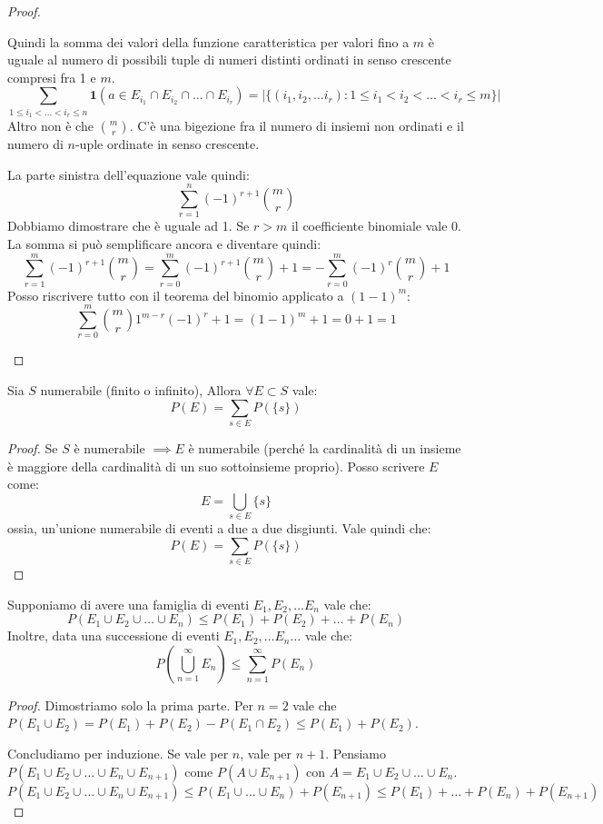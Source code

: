 \begin{proof}
\begin{enumerate}
    Quindi la somma dei valori della funzione caratteristica per valori fino a $m$ \`e uguale al numero di possibili tuple di numeri distinti ordinati in senso crescente compresi fra 1 e $m$.
    \[
    \sum_{1 \le i_1 < \dots < i_r \le n} \mathbf{1}(a \in E_{i_1} \cap E_{i_2} \cap \dots \cap E_{i_r}) = \left| \{(i_1,i_2, \dots i_r) : 1 \le i_1 < i_2 < \dots < i_r \le m\} \right|
    \]
    Altro non \`e che $\binom{m}{r}$. C'\`e una bigezione fra il numero di insiemi non ordinati e il numero di $n$-uple ordinate in senso crescente.

    La parte sinistra dell'equazione vale quindi:
    \[
    \sum_{r = 1}^{n} (-1)^{r+1} \binom{m}{r}
    \]
    Dobbiamo dimostrare che \`e uguale ad 1. Se $r > m$ il coefficiente binomiale vale 0. La somma si pu\`o semplificare ancora e diventare quindi:
    \[
    \sum_{r = 1}^{m} (-1)^{r+1} \binom{m}{r} =
    \sum_{r = 0}^{m} (-1)^{r+1} \binom{m}{r} + 1 =
    - \sum_{r = 0}^{m} (-1)^{r} \binom{m}{r} + 1
    \]
    Posso riscrivere tutto con il teorema del binomio applicato a $(1 - 1)^m$:
    \[
    \sum_{r = 0}^{m} \binom{m}{r} 1^{m-r} (-1)^r + 1 = (1-1)^m + 1 = 0 + 1 = 1
    \]
\end{enumerate}
\end{proof}
\begin{prop}\label{numerabile}
Sia $S$ numerabile (finito o infinito), Allora $\forall  E \subset S$ vale:
\[
P(E) = \sum_{s \in E} P(\{s\})
\]
\end{prop}
\begin{proof}
Se $S$ \`e numerabile $\implies E$ \`e numerabile (perch\'e la cardinalit\`a di un insieme \`e maggiore della cardinalit\`a di un suo sottoinsieme proprio). Posso scrivere $E$ come:
\[
E = \bigcup_{s \in E} \{ s \}
\]
ossia, un'unione numerabile di eventi a due a due disgiunti. Vale quindi che:
\[
P(E) = \sum_{s \in E} P(\{s\})
\]
\end{proof}

\begin{prop}
Supponiamo di avere una famiglia di eventi $E_1, E_2, \dots E_n$ vale che:
\[
P(E_1 \cup E_2 \cup \dots \cup E_n) \le P(E_1) + P(E_2) + \dots + P(E_n)
\]
Inoltre, data una successione di eventi $E_1, E_2, \dots E_n \dots$ vale che:
\[
P \left( \bigcup_{n = 1}^{\infty} E_n \right) \le \sum_{n = 1}^{\infty} P(E_n)
\]
\end{prop}
\begin{proof}
Dimostriamo solo la prima parte. Per $n = 2$ vale che $P(E_1 \cup E_2) = P(E_1) + P(E_2) - P(E_1 \cap E_2) \le P(E_1) + P(E_2)$.

Concludiamo per induzione. Se vale per $n$, vale per $n + 1$. Pensiamo $ P(E_1 \cup E_2 \cup \dots \cup E_n \cup E_{n+1}) $ come $P( A \cup E_{n+1})$ con $A = E_1 \cup E_2 \cup \dots \cup E_n$.
\[
P(E_1 \cup E_2 \cup \dots \cup E_n \cup E_{n+1}) \le P(E_1 \cup \dots \cup E_n) + P(E_{n+1}) \le P(E_1) + \dots + P(E_n) + P(E_{n+1})
\]
\end{proof}


